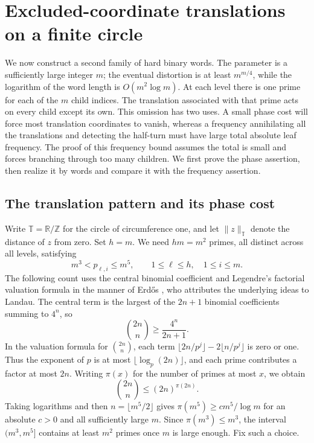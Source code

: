 \section{Excluded-coordinate translations on a finite circle}
\label{sec:excluded-coordinate}\label{sec:excluded}

We now construct a second family of hard binary words.  The parameter is a
sufficiently large integer $m$; the eventual distortion is at least
$m^{m/4}$, while the logarithm of the word length is $O(m^2\log m)$.
At each level there is one prime for each of the $m$ child indices.  The
translation associated with that prime acts on every child except its own.
This omission has two
uses.  A small phase cost will force most translation coordinates to vanish,
whereas a frequency annihilating all the translations and detecting the
half-turn must have large total absolute leaf frequency. The proof of this
frequency bound assumes the total is small and forces branching through
too many children.  We first prove the phase assertion, then realize it
by words and compare it with the frequency assertion.

\subsection{The translation pattern and its phase cost}

Write $\mathbb T=\mathbb R/\mathbb Z$ for the circle of circumference one,
and let $\|z\|_{\mathbb T}$ denote the distance of $z$ from zero.  Set $h=m$.
We need $hm=m^2$ primes, all distinct across all levels, satisfying
\begin{equation}\label{eq:exc-primes}
 m^3<p_{\ell,i}\le m^5,
 \qquad 1\le\ell\le h,\quad 1\le i\le m.
\end{equation}
The following count uses the central binomial coefficient and Legendre's
factorial valuation formula in the manner of Erd\H{o}s \cite{Erdos1932},
who attributes the underlying ideas to Landau.  The central term is the
largest of the $2n+1$ binomial coefficients summing to $4^n$, so
\[
 \binom{2n}{n}\ge\frac{4^n}{2n+1}.
\]
In the valuation formula for $\binom{2n}{n}$, each term
$\lfloor2n/p^j\rfloor-2\lfloor n/p^j\rfloor$ is zero or one.  Thus the
exponent of $p$ is at most $\lfloor\log_p(2n)\rfloor$, and each prime
contributes a factor at most $2n$.  Writing $\pi(x)$ for the number of
primes at most $x$, we obtain
\[
 \binom{2n}{n}\le (2n)^{\pi(2n)}.
\]
Taking logarithms and then $n=\lfloor m^5/2\rfloor$ gives
$\pi(m^5)\ge c m^5/\log m$ for an absolute $c>0$ and all sufficiently
large $m$.  Since $\pi(m^3)\le m^3$, the interval $(m^3,m^5]$ contains
at least $m^2$ primes once $m$ is large enough.  Fix such a choice.

